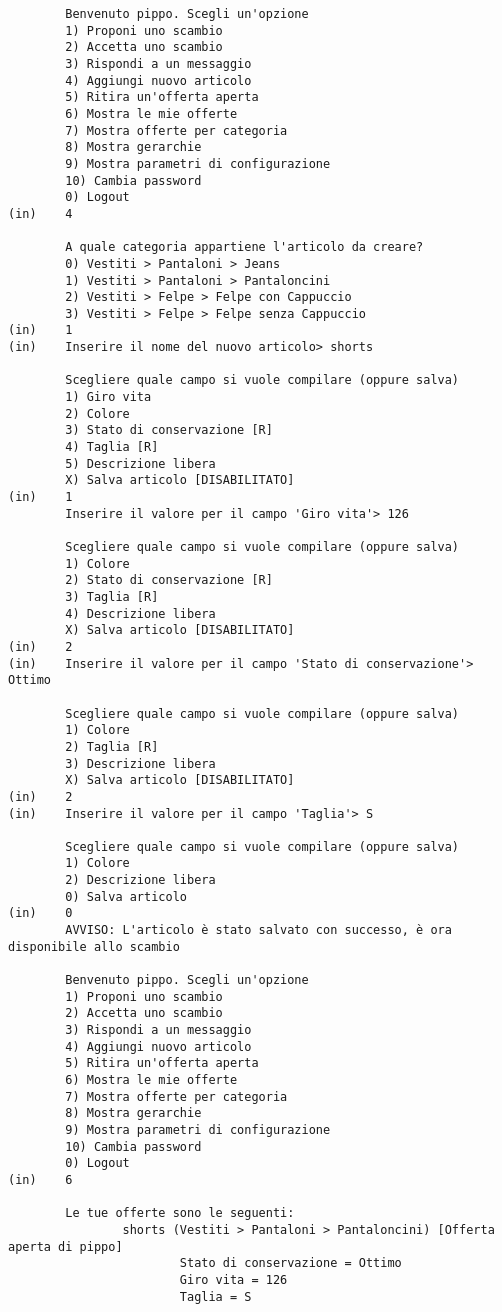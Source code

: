 \begin{lstlisting}
        Benvenuto pippo. Scegli un'opzione
        1) Proponi uno scambio
        2) Accetta uno scambio
        3) Rispondi a un messaggio
        4) Aggiungi nuovo articolo
        5) Ritira un'offerta aperta
        6) Mostra le mie offerte
        7) Mostra offerte per categoria
        8) Mostra gerarchie
        9) Mostra parametri di configurazione
        10) Cambia password
        0) Logout
(in)    4

        A quale categoria appartiene l'articolo da creare?
        0) Vestiti > Pantaloni > Jeans
        1) Vestiti > Pantaloni > Pantaloncini
        2) Vestiti > Felpe > Felpe con Cappuccio
        3) Vestiti > Felpe > Felpe senza Cappuccio
(in)    1
(in)    Inserire il nome del nuovo articolo> shorts

        Scegliere quale campo si vuole compilare (oppure salva)
        1) Giro vita
        2) Colore
        3) Stato di conservazione [R]
        4) Taglia [R]
        5) Descrizione libera
        X) Salva articolo [DISABILITATO]
(in)    1
        Inserire il valore per il campo 'Giro vita'> 126

        Scegliere quale campo si vuole compilare (oppure salva)
        1) Colore
        2) Stato di conservazione [R]
        3) Taglia [R]
        4) Descrizione libera
        X) Salva articolo [DISABILITATO]
(in)    2
(in)    Inserire il valore per il campo 'Stato di conservazione'> Ottimo

        Scegliere quale campo si vuole compilare (oppure salva)
        1) Colore
        2) Taglia [R]
        3) Descrizione libera
        X) Salva articolo [DISABILITATO]
(in)    2
(in)    Inserire il valore per il campo 'Taglia'> S  

        Scegliere quale campo si vuole compilare (oppure salva)
        1) Colore
        2) Descrizione libera
        0) Salva articolo
(in)    0
        AVVISO: L'articolo è stato salvato con successo, è ora disponibile allo scambio

        Benvenuto pippo. Scegli un'opzione
        1) Proponi uno scambio
        2) Accetta uno scambio
        3) Rispondi a un messaggio
        4) Aggiungi nuovo articolo
        5) Ritira un'offerta aperta
        6) Mostra le mie offerte
        7) Mostra offerte per categoria
        8) Mostra gerarchie
        9) Mostra parametri di configurazione
        10) Cambia password
        0) Logout
(in)    6

        Le tue offerte sono le seguenti: 
                shorts (Vestiti > Pantaloni > Pantaloncini) [Offerta aperta di pippo]
                        Stato di conservazione = Ottimo
                        Giro vita = 126
                        Taglia = S


\end{lstlisting}
